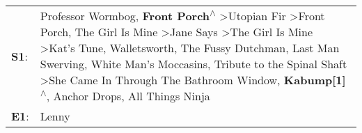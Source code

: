 \begin{supertabular}{p{0.03\textwidth}p{0.92\textwidth}}
 \textbf{S1}:  &  Professor Wormbog\textsuperscript{}, \enspace \textbf{Front Porch\textsuperscript{$\wedge$}} \textgreater \enspace Utopian Fir\textsuperscript{} \textgreater \enspace Front Porch\textsuperscript{}, \enspace The Girl Is Mine\textsuperscript{} \textgreater \enspace Jane Says\textsuperscript{} \textgreater \enspace The Girl Is Mine\textsuperscript{} \textgreater \enspace Kat's Tune\textsuperscript{}, \enspace Walletsworth\textsuperscript{}, \enspace The Fussy Dutchman\textsuperscript{}, \enspace Last Man Swerving\textsuperscript{}, \enspace White Man's Moccasins\textsuperscript{}, \enspace Tribute to the Spinal Shaft\textsuperscript{} \textgreater \enspace She Came In Through The Bathroom Window\textsuperscript{}, \enspace \textbf{Kabump[1]\textsuperscript{$\wedge$}}, \enspace Anchor Drops\textsuperscript{}, \enspace All Things Ninja\textsuperscript{}  \enspace  \\
 \textbf{E1}:  &                                                                                                                                                                                                                                                                                                                                                                                                                                                                                                                                                                                                                                                                                                                                                                                                                                                                       Lenny\textsuperscript{}  \enspace  \\
\end{supertabular}
